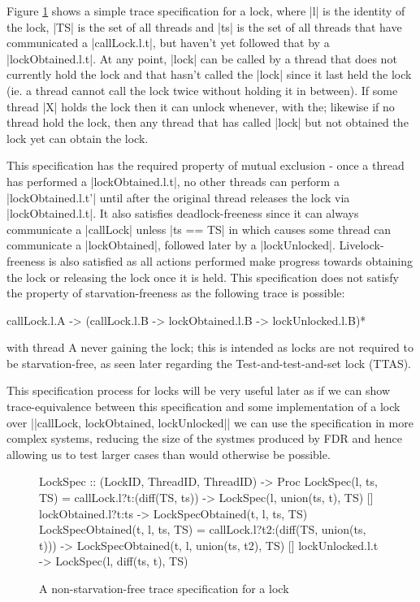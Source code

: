 Figure \ref{code:LockSpec} shows a simple trace specification for a lock, where |l| is the identity of the lock, |TS| is the set of all threads and |ts| is the set of all threads that have communicated a |callLock.l.t|, but haven't yet followed that by a |lockObtained.l.t|. At any point, |lock| can be called by a thread that does not currently hold the lock and that hasn't called the |lock| since it last held the lock (ie. a thread cannot call the lock twice without holding it in between). If some thread |X| holds the lock then it can unlock whenever, with the; likewise if no thread hold the lock, then any thread that has called |lock| but not obtained the lock yet can obtain the lock.

This specification has the required property of mutual exclusion - once a thread has performed a |lockObtained.l.t|, no other threads can perform a |lockObtained.l.t'| until after the original thread releases the lock via |lockObtained.l.t|. It also satisfies deadlock-freeness since it can always communicate a |callLock| unless |ts == TS| in which causes some thread can communicate a |lockObtained|, followed later by a |lockUnlocked|. Livelock-freeness is also satisfied as all actions performed make progress towards obtaining the lock or releasing the lock once it is held. This specification does not satisfy the property of starvation-freeness as the following trace is possible:
\begin{cspm}
  callLock.l.A -> (callLock.l.B -> lockObtained.l.B -> lockUnlocked.l.B)*
\end{cspm}
with thread A never gaining the lock; this is intended as locks are not required to be starvation-free, as seen later regarding the Test-and-test-and-set lock (TTAS).

This specification process for locks will be very useful later as if we can show trace-equivalence between this specification and some implementation of a lock over |{|callLock, lockObtained, lockUnlocked|}| we can use the specification in more complex systems, reducing the size of the systmes produced by FDR and hence allowing us to test larger cases than would otherwise be possible. 

\begin{figure}
\begin{cspm}
  LockSpec :: (LockID, {ThreadID}, {ThreadID}) -> Proc
  LockSpec(l, ts, TS) = callLock.l?t:(diff(TS, ts)) -> LockSpec(l, union(ts, {t}), TS)
                  [] lockObtained.l?t:ts -> LockSpecObtained(t, l, ts, TS)
  LockSpecObtained(t, l, ts, TS) = callLock.l?t2:(diff(TS, union(ts, {t}))) -> 
                                        LockSpecObtained(t, l, union(ts, {t2}), TS)
                  [] lockUnlocked.l.t -> LockSpec(l, diff(ts, {t}), TS)

\end{cspm}
\caption{A non-starvation-free trace specification for a lock}
\label{code:LockSpec}
\end{figure}


